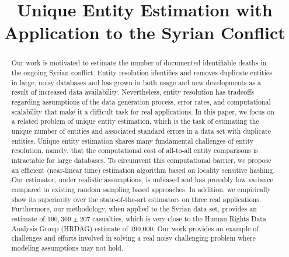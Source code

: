 \documentclass[aoas]{imsart}
\begin{document}
\begin{frontmatter}
\title{ Unique Entity Estimation with Application to the Syrian Conflict}





\begin{abstract}
Our work is motivated to estimate the number of documented identifiable deaths in the ongoing Syrian conflict.
Entity resolution identifies and removes duplicate entities in large, noisy databases and has grown in both usage and new developments as a result of increased data availability. Nevertheless, entity resolution has tradeoffs regarding assumptions of the data generation process, error rates, and computational scalability that make it a difficult task for real applications. In this paper, we focus on a related problem of unique entity estimation, which is the task of estimating the unique number of entities and associated standard errors in a data set with duplicate entities. Unique entity estimation shares many fundamental challenges of entity resolution, namely, that the computational cost of all-to-all entity comparisons is intractable for large databases. To circumvent this computational barrier, we propose an efficient (near-linear time) estimation algorithm based on locality sensitive hashing. Our estimator, under realistic assumptions, is unbiased and has provably low variance compared to existing random sampling based approaches. In addition, we empirically show its superiority over the state-of-the-art estimators on three real applications. Furthermore, our methodology, when applied to the Syrian data set, provides an estimate of $190,369 \pm 207$ casualties, which is very close to the Human Rights Data Analysis Group (HRDAG) estimate of 190,000. Our work provides an example of challenges and efforts involved in solving a real noisy challenging problem where modeling assumptions may not hold.
\end{abstract}


\begin{keyword}
\end{keyword}

\end{frontmatter}
\end{document}
